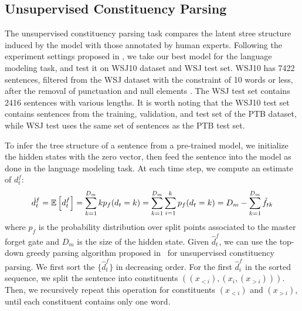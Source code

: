 \documentclass{article} \usepackage{iclr2019_conference,times}
\begin{document}
\subsection{Unsupervised Constituency Parsing}
The unsupervised constituency parsing task compares the latent stree structure induced by the model with those annotated by human experts.
Following the experiment settings proposed in \citet{htut2018grammar}, we take our best model for the language modeling task, and test it on WSJ10 dataset and WSJ test set.
WSJ10 has 7422 sentences, filtered from the WSJ dataset with the constraint of 10 words or less, after the removal of punctuation and null elements \citep{klein2002generative}.
The WSJ test set contains 2416 sentences with various lengths.
It is worth noting that the WSJ10 test set contains sentences from the training, validation, and test set of the PTB dataset, while WSJ test uses the same set of sentences as the PTB test set.

To infer the tree structure of a sentence from a pre-trained model, we initialize the hidden states with the zero vector, then feed the sentence into the model as done in the language modeling task. At each time step, we compute an estimate of $d^f_t$:
\begin{equation}
    \hat{d}^f_t = \mathbb{E} \left[ d^f_t \right] = \sum_{k=1}^{D_m} k p_f(d_t=k) = \sum_{k=1}^{D_m} \sum_{i=1}^{k} p_f(d_t=k) = D_m - \sum_{k=1}^{D_m} \Tilde{f}_{tk}
\end{equation}
where $p_f$ is the probability distribution over split points associated to the master forget gate and $D_m$ is the size of the hidden state. Given $\hat{d}^f_t$, we can use the top-down greedy parsing algorithm proposed in~\citet{shen2017neural} for unsupervised constituency parsing. We first sort the $\{\hat{d}^f_t\}$ in decreasing order. For the first $\hat{d}^f_i$ in the sorted sequence, we split the sentence into constituents $((x_{<i}), (x_{i}, (x_{>i})))$. Then, we recursively repeat this operation for constituents $(x_{<i})$ and $(x_{>i})$, until each constituent contains only one word.
\end{document}
